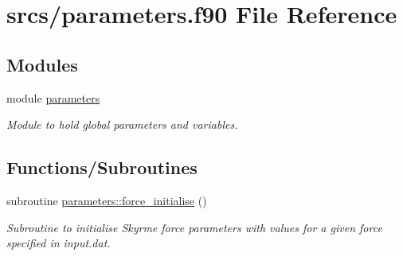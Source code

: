 \hypertarget{parameters_8f90}{}\section{srcs/parameters.f90 File Reference}
\label{parameters_8f90}
\subsection*{Modules}
\begin{DoxyCompactItemize}
\item 
module \mbox{\hyperlink{namespaceparameters}{parameters}}
\begin{DoxyCompactList}\small\item\em Module to hold global parameters and variables. \end{DoxyCompactList}\end{DoxyCompactItemize}
\subsection*{Functions/\+Subroutines}
\begin{DoxyCompactItemize}
\item 
subroutine \mbox{\hyperlink{namespaceparameters_a55242f635842d12dbb53d66ae9248b93}{parameters\+::force\+\_\+initialise}} ()
\begin{DoxyCompactList}\small\item\em Subroutine to initialise Skyrme force parameters with values for a given force specified in \textquotesingle{}input.\+dat\textquotesingle{}. \end{DoxyCompactList}\end{DoxyCompactItemize}
